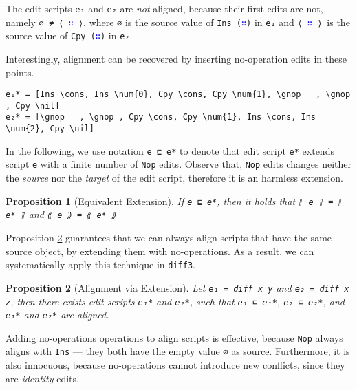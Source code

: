 \documentclass{sigplanconf}
\theoremstyle{plain}
\newtheorem{prop}{Proposition}
\newcommand{\nil}{\textcolor{blue}{\texttt{[]}}}
\newcommand{\cons}{\texttt{(\textcolor{blue}{∷})}}
\newcommand{\consn}{\texttt{⟨ \textcolor{blue}{∷} ⟩}}
\newcommand{\num}[1]{\textcolor{magenta}{\texttt{#1}}}
\newcommand{\gnop}{\textcolor{dgreen}{Nop}}
\begin{document}
The edit scripts \texttt{e₁} and \texttt{e₂} are \emph{not} aligned, because
their first edits are not, namely \texttt{∅ ≢ \consn}, where
\texttt{∅} is the source value of \texttt{Ins \cons} in \texttt{e₁} and
\consn\ is the source value of \texttt{Cpy \cons} in
\texttt{e₂}.

Interestingly, alignment can be recovered by inserting no-operation
edits in these points.
\begin{Verbatim}[commandchars=\\\{\}]
e₁* = [Ins \cons, Ins \num{0}, Cpy \cons, Cpy \num{1}, \gnop   , \gnop , Cpy \nil]
e₂* = [\gnop   , \gnop , Cpy \cons, Cpy \num{1}, Ins \cons, Ins \num{2}, Cpy \nil] 
\end{Verbatim}       

In the following, we use notation \texttt{e ⊑ e*} to denote that edit
script \texttt{e*} extends script \texttt{e} with a finite number of
\texttt{Nop} edits.
%
Observe that, \texttt{Nop} edits changes neither the \emph{source} nor the
\emph{target} of the edit script, therefore it is an harmless
extension.
\begin{prop}[Equivalent Extension]
  If \texttt{e ⊑ e*}, then it holds that \texttt{⟦ e ⟧ ≡ ⟦ e* ⟧} and
  \texttt{⟪ e ⟫ ≡ ⟪ e* ⟫}
\end{prop}

Proposition \ref{prop:align-ext} guarantees that we can always
align scripts that have the same source object, by extending them
with no-operations.
%
As a result, we can systematically apply this technique in
\texttt{diff3}.
%
\begin{prop}[Alignment via Extension]
\label{prop:align-ext}
  Let \texttt{e₁ = diff x y} and \texttt{e₂ = diff x z}, then there
  exists edit scripts \texttt{e₁*} and \texttt{e₂*}, such that
  \texttt{e₁ ⊑ e₁*}, \texttt{e₂ ⊑ e₂*}, and \texttt{e₁*} and
  \texttt{e₂*} are aligned.
\end{prop}
Adding no-operations operations to align scripts is effective, because
\texttt{Nop} always aligns with \texttt{Ins} --- they both have the
empty value \texttt{∅} as source.
%
Furthermore, it is also innocuous, because no-operations cannot
introduce new conflicts, since they are \emph{identity} edits.


\end{document}
